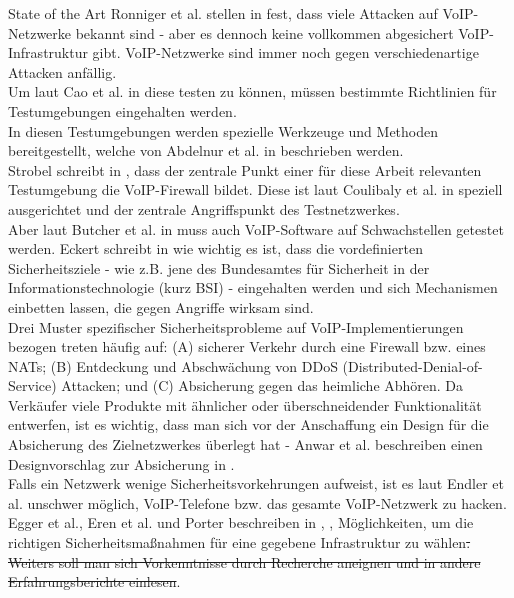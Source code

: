 \documentclass[a4paper,11pt,ngerman]{INSOexpose}
\providecommand{\DIFdel}[1]{{\protect\color{red}\sout{#1}}}                      %
\providecommand{\DIFdelbegin}{} %
\providecommand{\DIFdelend}{} %
\begin{document}
\begin{section}{State of the Art}
Ronniger et al. stellen in \cite{Ronniger:2010:robflex}  fest, dass viele Attacken auf VoIP-Netzwerke bekannt sind - aber es dennoch keine vollkommen abgesichert VoIP-Infrastruktur gibt. VoIP-Netzwerke sind immer noch gegen verschiedenartige Attacken anfällig. \\
Um laut Cao et al. in \cite{CaoWang:2009:DevLab} diese testen zu können, müssen bestimmte Richtlinien für Testumgebungen eingehalten
werden. \\
In diesen Testumgebungen werden spezielle Werkzeuge und Methoden bereitgestellt, welche von Abdelnur et al. in \cite{Abdelnur:2006:voipass} beschrieben werden.  \\
Strobel schreibt in \cite{Coulibaly:2010:secvoipb}, dass der zentrale Punkt einer für diese Arbeit relevanten Testumgebung die VoIP-Firewall bildet. Diese ist laut Coulibaly et al. in \cite{Coulibaly:2010:secvoipb}  speziell ausgerichtet und der zentrale Angriffspunkt des Testnetzwerkes. \\
Aber laut Butcher et al. in  \cite{Butcher:2007:SecChall}   muss auch VoIP-Software auf Schwachstellen getestet werden. 
Eckert schreibt in  \cite{eckert:2009:sicherheit} wie wichtig es ist, dass die vordefinierten Sicherheitsziele - wie z.B. jene des Bundesamtes für Sicherheit in der Informationstechnologie (kurz BSI) - eingehalten werden und sich
Mechanismen einbetten lassen, die gegen Angriffe wirksam sind. 
\\
Drei Muster spezifischer Sicherheitsprobleme auf VoIP-Implementierungen bezogen treten
häufig auf: (A) sicherer Verkehr durch eine Firewall bzw. eines NATs; (B) Entdeckung und
Abschwächung von DDoS (Distributed-Denial-of-Service) Attacken; und (C) Absicherung
gegen das heimliche Abhören. Da Verkäufer viele Produkte mit ähnlicher oder
überschneidender Funktionalität entwerfen, ist es wichtig, dass man sich vor der
Anschaffung ein Design für die Absicherung des Zielnetzwerkes überlegt hat - Anwar et al. beschreiben einen Designvorschlag zur Absicherung in \cite{Anwar:2006:despatt} .\\
Falls ein Netzwerk wenige Sicherheitsvorkehrungen aufweist, ist es laut Endler et al. \cite{endler:2006:hacking} unschwer möglich, VoIP-Telefone bzw. das gesamte VoIP-Netzwerk zu hacken.
 \\
Egger et al., Eren et al. und Porter beschreiben in \cite{Egger:2008:linVoip} ,\cite{eren:2007:voip} ,\cite{porter:2006:practicalvoip} Möglichkeiten, um die richtigen Sicherheitsmaßnahmen für eine gegebene Infrastruktur zu wählen\DIFdelbegin \DIFdel{. Weiters soll man sich Vorkenntnisse durch Recherche aneignen und in andere Erfahrungsberichte einlesen}\DIFdelend . \\

\end{section}
\pagebreak
\end{document}
